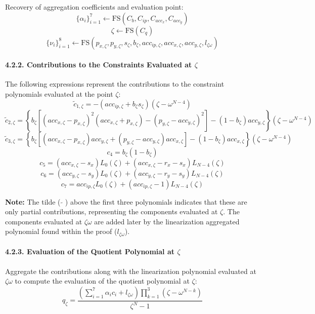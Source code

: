 \documentclass[
]{article}
\begin{document}
Recovery of aggregation coefficients and evaluation point:
\[\{\alpha_i\}_{i=1}^7 \leftarrow \text{FS}(C_b, C_{ip}, C_{acc_x}, C_{acc_y})\]
\[\zeta \leftarrow \text{FS}(C_q)\]
\[\{\nu_i\}_{i=1}^8 \leftarrow \text{FS}(p_{x,\zeta}, p_{y,\zeta}, s_\zeta, b_\zeta, acc_{ip,\zeta}, acc_{x,\zeta}, acc_{y,\zeta}, l_{\zeta\omega})\]

\hypertarget{contributions-to-the-constraints-evaluated-at-zeta}{%
\paragraph{\texorpdfstring{4.2.2. Contributions to the Constraints
Evaluated at
\(\zeta\)}{4.2.2. Contributions to the Constraints Evaluated at \textbackslash zeta}}\label{contributions-to-the-constraints-evaluated-at-zeta}}

The following expressions represent the contributions to the constraint
polynomials evaluated at the point \(\zeta\):
\[\tilde{c}_{1,\zeta}=-(acc_{ip,\zeta}+b_\zeta s_\zeta)(\zeta-\omega^{N-4})\]
\[\tilde{c}_{2,\zeta}=\left\{b_\zeta\left[(acc_{x,\zeta}-p_{x,\zeta})^2(acc_{x,\zeta}+p_{x,\zeta})-(p_{y,\zeta}-acc_{y,\zeta})^2\right]-(1-b_\zeta)acc_{y,\zeta}\right\}(\zeta-\omega^{N-4})\]
\[\tilde{c}_{3,\zeta}=\left\{b_\zeta\left[(acc_{x,\zeta}-p_{x,\zeta})acc_{y,\zeta}+(p_{y,\zeta}-acc_{y,\zeta})acc_{x,\zeta}\right]-(1-b_\zeta)acc_{x,\zeta}\right\}(\zeta-\omega^{N-4})\]
\[c_4=b_{\zeta}(1-b_{\zeta})\]
\[c_5=(acc_{x,\zeta}-s_x)L_0(\zeta)+(acc_{x,\zeta}-r_x-s_x)L_{N-4}(\zeta)\]
\[c_6=(acc_{y,\zeta}-s_y)L_0(\zeta)+(acc_{y,\zeta}-r_y-s_y)L_{N-4}(\zeta)\]
\[c_7=acc_{ip,\zeta}L_0(\zeta)+(acc_{ip,\zeta}-1)L_{N-4}(\zeta)\]

\textbf{Note:} The tilde ( \(\tilde{}\) ) above the first three
polynomials indicates that these are only partial contributions,
representing the components evaluated at \(\zeta\). The components
evaluated at \(\zeta \omega\) are added later by the linearization
aggregated polynomial found within the proof (\(l_{\zeta\omega}\)).

\hypertarget{evaluation-of-the-quotient-polynomial-at-zeta}{%
\paragraph{\texorpdfstring{4.2.3. Evaluation of the Quotient Polynomial
at
\(\zeta\)}{4.2.3. Evaluation of the Quotient Polynomial at \textbackslash zeta}}\label{evaluation-of-the-quotient-polynomial-at-zeta}}

Aggregate the contributions along with the linearization polynomial
evaluated at \(\zeta \omega\) to compute the evaluation of the quotient
polynomial at \(\zeta\):
\[q_{\zeta}=\frac{(\sum_{i=1}^7\alpha_ic_i+l_{\zeta\omega})\prod_{k=1}^3(\zeta-\omega^{N-k})}{\zeta^N-1}\]
\end{document}

